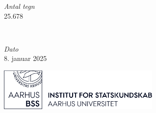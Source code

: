 
	\begin{minipage}{0.4\textwidth}
		\begin{flushleft}
			\large
			\textit{Antal tegn}\\
			25.678\\
		\end{flushleft}
	\end{minipage}
	~
	\begin{minipage}{0.4\textwidth}
		\begin{flushright}
			\large
			\textit{Dato}\\
			8. januar 2025
		\end{flushright}
	\end{minipage}


	\vfill\vfill
	\includegraphics[width=0.6\textwidth]{tex/images/ifsk-logo-black.png}
